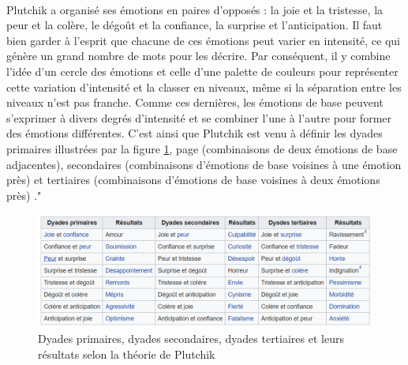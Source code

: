 ~\par
Plutchik a organisé ses émotions en paires d'opposés : la joie et la tristesse, la peur et la colère, le dégoût et la confiance, la surprise et l'anticipation. Il faut bien garder à l'esprit que chacune de ces émotions peut varier en intensité, ce qui génère un grand nombre de mots pour les décrire. Par conséquent, il y combine l'idée d'un cercle des émotions et celle d'une palette de couleurs pour représenter cette variation d'intensité et la classer en niveaux, même si la séparation entre les niveaux n'est pas franche. Comme ces dernières, les émotions de base peuvent s'exprimer à divers degrés d'intensité et se combiner l'une à l'autre pour former des émotions différentes. C'est ainsi que Plutchik est venu à définir les dyades primaires illustrées par la figure \ref{fig:TbEm}, page \pageref{fig:TbEm} (combinaisons de deux émotions de base adjacentes), secondaires (combinaisons d'émotions de base voisines à une émotion près) et tertiaires (combinaisons d'émotions de base voisines à deux émotions près)   \parencite{tayari2009modelisation}."



\begin{figure}[th]
\hspace*{-1.9cm} 
\centering
\includegraphics{Figures/tableauEmotions.PNG}
\decoRule
\caption[Tableau de la théorie de Plutchik]{Dyades primaires, dyades secondaires, dyades tertiaires et leurs résultats selon la théorie de Plutchik}
\label{fig:TbEm}
\end{figure}




